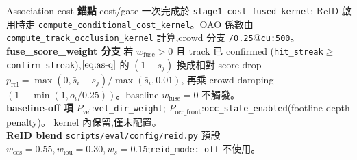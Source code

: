 \begin{implsupp}{Association cost}
\textbf{錨點}\;\; cost/gate 一次完成於 \texttt{stage1\_cost\_fused\_kernel};
ReID 啟用時走 \texttt{compute\_conditional\_cost\_kernel}。OAO 係數由
\texttt{compute\_track\_occlusion\_kernel} 計算,crowd 分支 \texttt{/0.25}@\texttt{cu:500}。\\
\textbf{fuse\_score\_weight 分支}\;\; 若 \(w_{\mathrm{fuse}}{>}0\) 且 track 已 confirmed
(\texttt{hit\_streak}\(\ge\)\texttt{confirm\_streak}),\(\Cref{eq:as-q}\) 的 \((1-s_j)\)
換成相對 score-drop \(p_{\mathrm{rel}}=\max(0,\bar{s}_i-s_j)/\max(\bar{s}_i,0.01)\),
再乘 crowd damping \((1-\min(1,o_i/0.25))\)。baseline \(w_{\mathrm{fuse}}{=}0\) 不觸發。\\
\textbf{baseline-off 項}\;\; \(P_{\mathrm{vel}}\):\texttt{vel\_dir\_weight};
\(P_{\mathrm{occ\_front}}\):\texttt{occ\_state\_enabled}(footline depth penalty)。
kernel 內保留,僅未配置。\\
\textbf{ReID blend}\;\; \texttt{scripts/eval/config/reid.py} 預設
\(w_{\cos}{=}0.55,w_{\mathrm{iou}}{=}0.30,w_s{=}0.15\);\texttt{reid\_mode: off} 不使用。
\end{implsupp}
